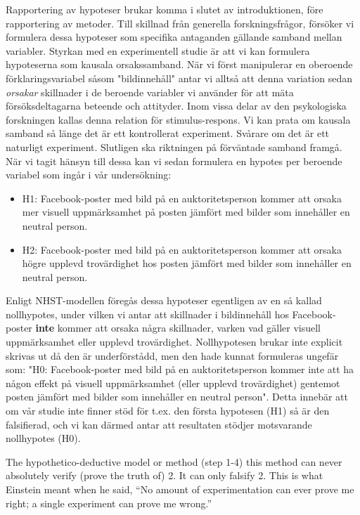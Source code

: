 \documentclass[
]{book}
\begin{document}
Rapportering av hypoteser brukar komma i slutet av introduktionen, före rapportering av metoder. Till skillnad från generella forskningsfrågor, försöker vi formulera dessa hypoteser som specifika antaganden gällande samband mellan variabler. Styrkan med en experimentell studie är att vi kan formulera hypoteserna som kausala orsakssamband. När vi först manipulerar en oberoende förklaringsvariabel såsom "bildinnehåll" antar vi alltså att denna variation sedan \emph{orsakar} skillnader i de beroende variabler vi använder för att mäta försöksdeltagarna beteende och attityder. Inom vissa delar av den psykologiska forskningen kallas denna relation för stimulus-respons. Vi kan prata om kausala samband så länge det är ett kontrollerat experiment. Svårare om det är ett naturligt experiment. Slutligen ska riktningen på förväntade samband framgå. När vi tagit hänsyn till dessa kan vi sedan formulera en hypotes per beroende variabel som ingår i vår undersökning:

\begin{itemize}
\item
  H1: Facebook-poster med bild på en auktoritetsperson kommer att orsaka mer visuell uppmärksamhet på posten jämfört med bilder som innehåller en neutral person.
\item
  H2: Facebook-poster med bild på en auktoritetsperson kommer att orsaka högre upplevd trovärdighet hos posten jämfört med bilder som innehåller en neutral person.
\end{itemize}

Enligt NHST-modellen föregås dessa hypoteser egentligen av en så kallad nollhypotes, under vilken vi antar att skillnader i bildinnehåll hos Facebook-poster \textbf{inte} kommer att orsaka några skillnader, varken vad gäller visuell uppmärksamhet eller upplevd trovärdighet. Nollhypotesen brukar inte explicit skrivas ut då den är underförstådd, men den hade kunnat formuleras ungefär som: "H0: Facebook-poster med bild på en auktoritetsperson kommer inte att ha någon effekt på visuell uppmärksamhet (eller upplevd trovärdighet) gentemot posten jämfört med bilder som innehåller en neutral person". Detta innebär att om vår studie inte finner stöd för t.ex. den första hypotesen (H1) så är den falsifierad, och vi kan därmed antar att resultaten stödjer motsvarande nollhypotes (H0).

The hypothetico-deductive model or method (step 1-4) this method can never absolutely verify (prove the truth of) 2. It can only falsify 2. This is what Einstein meant when he said, ``No amount of experimentation can ever prove me right; a single experiment can prove me wrong.'' \citep{einstein2002induction}
\end{document}
